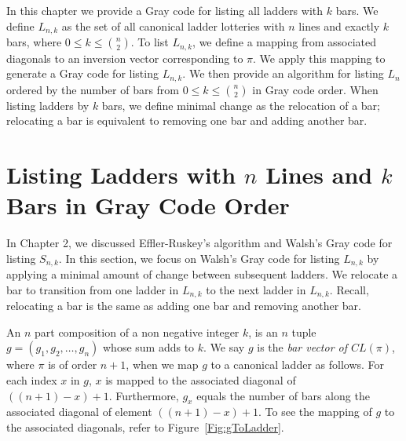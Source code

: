 In this chapter we provide a Gray code for listing all ladders with $k$ bars. 
We define $L_{n,k}$ as the set of all canonical ladder lotteries with $n$ lines and exactly $k$ bars, where $0 \leq k \leq {n \choose 2}$. To list $L_{n,k}$, 
we define a mapping from associated diagonals to 
an inversion vector corresponding to $\pi$. We apply this mapping to generate a Gray code for listing $L_{n,k}$. 
We then provide an algorithm for listing $L_{n}$ ordered by the number of bars from $0 \leq k \leq {n \choose 2}$ in Gray code order. When listing ladders by $k$ 
bars, we define minimal change as the relocation 
of a bar; relocating a bar is equivalent to removing one bar and adding another bar.  



\section{Listing Ladders with $n$ Lines and $k$ Bars in Gray Code Order}
 In Chapter 2, we discussed Effler-Ruskey's algorithm and Walsh's Gray code for listing $S_{n,k}$. 
In this section, we focus on Walsh's Gray code for listing $L_{n,k}$ by applying a minimal amount of change between subsequent ladders. We 
relocate a bar to transition from one ladder in $L_{n,k}$ to the next ladder in $L_{n,k}$. Recall, relocating a bar is the same as 
adding one bar and removing another bar.\par  
An $n$ part composition of a non negative integer $k$, is an $n$ tuple $g=(g_{1}, g_{2}, \dots, g_{n})$ whose sum adds to $k$. We 
say $g$ is the \emph{bar vector of $CL(\pi)$}, where $\pi$ is of order $n+1$, 
when we map $g$ to a canonical ladder as follows. For each 
index $x$ in $g$, $x$ is mapped to the associated diagonal of $((n+1)-x) + 1$. Furthermore, $g_{x}$ equals the number of bars along the associated 
diagonal of element $((n+1)-x) + 1$. To see the mapping of $g$ to the associated diagonals, refer to Figure~\ref{Fig:gToLadder}.\par 

